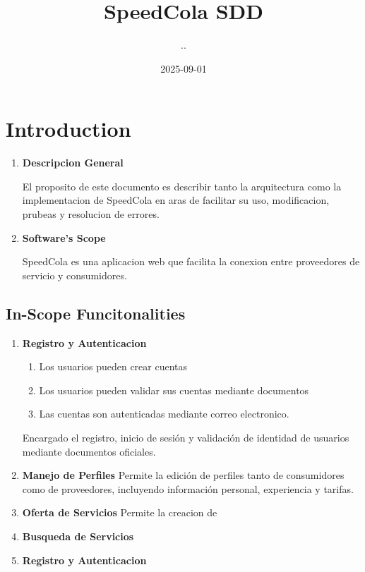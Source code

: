 \documentclass{article}
\title{SpeedCola SDD}
\date{2025-09-01}
\author{..}
\begin{document}
\maketitle
\newpage
{}

\section{Introduction}
\begin{enumerate}
  \item  \textbf{Descripcion General}

El proposito de este documento es describir tanto la arquitectura como la implementacion de 
SpeedCola en aras de facilitar su uso, modificacion, prubeas y resolucion de errores.

\item \textbf{Software's Scope}

SpeedCola es una aplicacion web que facilita la conexion entre proveedores de servicio y consumidores.

\end{enumerate}

\subsection{In-Scope Funcitonalities}
  \begin{enumerate}
    \item \textbf{Registro y Autenticacion}
      \begin{enumerate}
        \item Los usuarios pueden crear cuentas
        \item Los usuarios pueden validar sus cuentas mediante documentos
        \item Las cuentas son autenticadas mediante correo electronico.
      \end{enumerate}
      Encargado el registro, inicio de sesión y validación de identidad de usuarios mediante documentos oficiales. 
    \item \textbf{Manejo de Perfiles}
    Permite la edición de perfiles tanto de consumidores como de proveedores, incluyendo información personal, experiencia y tarifas.  
    \item \textbf{Oferta de Servicios}
      Permite la creacion de 
    \item \textbf{Busqueda de Servicios}
    \item \textbf{Registro y Autenticacion}
  \end{enumerate}
\end{document}
